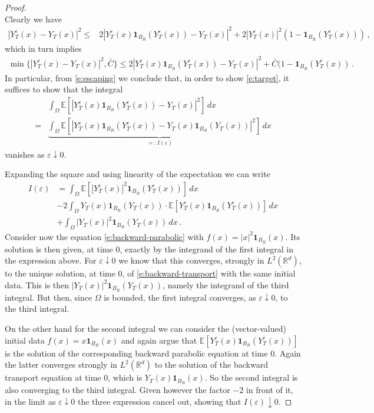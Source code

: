 \documentclass[11pt,reqno]{amsart}
\theoremstyle{definition}
\numberwithin{equation}{section}
\begin{document}
\begin{proof}
\begin{equation}
\end{equation}
Clearly we have 
\begin{align*}
|Y^\varepsilon_T (x) - Y_T (x)|^2
\leq & 2 |Y^\varepsilon_T (x) \mathbf{1}_{B_R} (Y^\varepsilon_T (x)) - Y_T (x)|^2
+ 2 |Y^\varepsilon_T (x)|^2 (1-\mathbf{1}_{B_R} (Y^\varepsilon_T (x)))\, , 
\end{align*}
which in turn implies 
\begin{align*}
\min \{|Y^\varepsilon_T (x) - Y_T (x)|^2, \bar C\}
\leq 2  |Y^\varepsilon_T (x) \mathbf{1}_{B_R} (Y^\varepsilon_T (x)) - Y_T (x)|^2
+ \bar C (1-\mathbf{1}_{B_R} (Y^\varepsilon_T (x))\, .
\end{align*}
In particular, from \eqref{e:escaping} we conclude that, in order to show \eqref{e:target}, it suffices to show that the integral
\begin{align*}
&\int_\Omega {\mathbb E} [|Y_T^\varepsilon (x) \mathbf{1}_{B_R} (Y_T^\varepsilon (x)) - Y_T (x) |^2]\, dx \\
= & \underbrace{\int_\Omega {\mathbb E} [|Y_T^\varepsilon (x) \mathbf{1}_{B_R} (Y_T^\varepsilon (x)) - Y_T (x)\mathbf{1}_{B_R} (Y_T (x)) |^2]\, dx}_{=: I (\varepsilon)}
\end{align*}
vanishes as $\varepsilon\downarrow 0$. 

Expanding the square and using linearity of the expectation we can write 
\begin{align*}
I (\varepsilon) &= \int_\Omega {\mathbb E} [|Y_T^\varepsilon (x)|^2 \mathbf{1}_{B_R} (Y_T^\varepsilon (x))]\, dx\\
& - 2 \int_\Omega Y_T (x) \mathbf{1}_{B_R} (Y_T (x)) \cdot {\mathbb E} [Y_T^\varepsilon (x) \mathbf{1}_{B_R} (Y_T^\varepsilon (x))]\, dx\\
&+ \int_\Omega |Y_T (x)|^2\mathbf{1}_{B_R} (Y_T (x)) \, dx\, . 
\end{align*}
Consider now the equation \eqref{e:backward-parabolic} with $f (x) = |x|^2 \mathbf{1}_{B_R} (x)$. Its solution is then given, at time $0$, exactly by the integrand of the first integral in the expression above. For $\varepsilon\downarrow 0$ we know that this converges, strongly in $L^2 (\mathbb R^d)$, to the unique solution, at time $0$, of \eqref{e:backward-transport} with the same initial data. This is then $|Y_T (x)|^2 \mathbf{1}_{B_R} (Y_T (x))$, namely the integrand of the third integral. But then, since $\Omega$ is bounded, the first integral converges, as $\varepsilon\downarrow 0$, to the third integral. 

On the other hand for the second integral we can consider the (vector-valued) initial data $f (x) = x \mathbf{1}_{B_R} (x)$ and again argue that ${\mathbb E}  [Y_T^\varepsilon (x) \mathbf{1}_{B_R} (Y_T^\varepsilon (x))]$ is the solution of the corresponding backward parabolic equation at time $0$. Again the latter converges strongly in $L^2 (\mathbb R^d)$ to the solution of the backward transport equation at time $0$, which is $Y_T (x) \mathbf{1}_{B_R} (x)$. So the second integral is also converging to the third integral. Given however the factor $-2$ in front of it, in the limit as $\varepsilon\downarrow 0$ the three expression cancel out, showing that $I (\varepsilon)\downarrow 0$. 
\end{proof}
\end{document}
